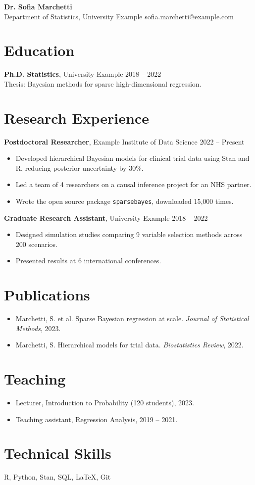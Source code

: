 \documentclass[11pt]{article}
\begin{document}
\begin{center}
{\LARGE \textbf{Dr. Sofia Marchetti}}\\
Department of Statistics, University Example \quad sofia.marchetti@example.com
\end{center}
\section*{Education}
\textbf{Ph.D. Statistics}, University Example \hfill 2018 -- 2022\\
Thesis: Bayesian methods for sparse high-dimensional regression.
\section*{Research Experience}
\textbf{Postdoctoral Researcher}, Example Institute of Data Science \hfill 2022 -- Present
\begin{itemize}
\item Developed hierarchical Bayesian models for clinical trial data using Stan and R, reducing posterior uncertainty by 30\%.
\item Led a team of 4 researchers on a causal inference project for an NHS partner.
\item Wrote the open source package \texttt{sparsebayes}, downloaded 15,000 times.
\end{itemize}
\textbf{Graduate Research Assistant}, University Example \hfill 2018 -- 2022
\begin{itemize}
\item Designed simulation studies comparing 9 variable selection methods across 200 scenarios.
\item Presented results at 6 international conferences.
\end{itemize}
\newpage
\section*{Publications}
\begin{itemize}
\item Marchetti, S. et al. Sparse Bayesian regression at scale. \emph{Journal of Statistical Methods}, 2023.
\item Marchetti, S. Hierarchical models for trial data. \emph{Biostatistics Review}, 2022.
\end{itemize}
\section*{Teaching}
\begin{itemize}
\item Lecturer, Introduction to Probability (120 students), 2023.
\item Teaching assistant, Regression Analysis, 2019 -- 2021.
\end{itemize}
\section*{Technical Skills}
R, Python, Stan, SQL, LaTeX, Git
\end{document}
